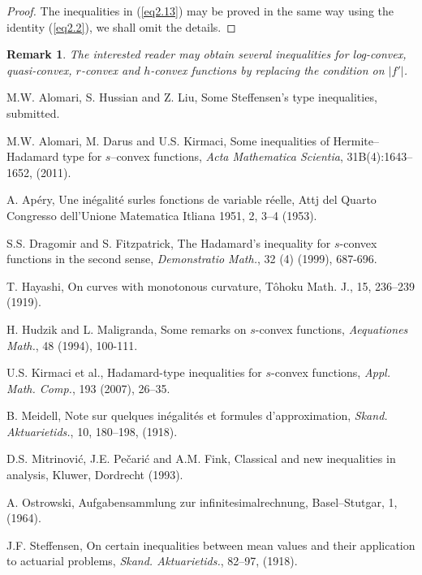 \documentclass{amsart}
\theoremstyle{plain}
\newtheorem{remark}{Remark}
\numberwithin{equation}{section}
\begin{document}
\begin{proof}
The inequalities in (\ref{eq2.13}) may be proved in the same way
using the identity (\ref{eq2.2}), we shall omit the details.
\end{proof}

\begin{remark}
The interested reader may obtain several inequalities for
log-convex, quasi-convex, $r$-convex and $h$-convex functions by
replacing the condition on $|f'|$.
\end{remark}














\begin{thebibliography}{9}
\setlength{\itemsep}{5pt}

M.W. Alomari, S. Hussian and Z. Liu, Some Steffensen's type
inequalities, submitted.

M.W. Alomari, M. Darus and U.S. Kirmaci, Some inequalities of
Hermite--Hadamard type for $s$--convex functions, \textit{Acta
Mathematica Scientia}, 31B(4):1643--1652, (2011).


A. Ap\'{e}ry, Une in\'{e}galit\'{e} surles fonctions de variable
r\'{e}elle, Attj del Quarto Congresso dell'Unione Matematica
Itliana 1951, 2, 3--4 (1953).

 S.S. Dragomir and S. Fitzpatrick, The Hadamard's inequality for
$s$-convex functions in the second sense, \emph{Demonstratio
Math.}, 32 (4) (1999), 687-696.

T. Hayashi, On curves with monotonous curvature, T\^{o}hoku Math.
J., 15, 236--239 (1919).


 H. Hudzik and L. Maligranda, Some remarks on $s$-convex
functions, \emph{Aequationes Math.}, 48 (1994), 100-111.

 {U.S. Kirmaci et al., Hadamard-type inequalities for $s$-convex
functions, \emph{Appl. Math. Comp.},} {193} (2007), 26--35.

B. Meidell, Note sur quelques in\'{e}galit\'{e}s et formules
d'approximation, \textit{Skand. Aktuarietids.}, 10, 180--198,
(1918).

D.S. Mitrinovi\'{c}, J.E. Pe\v{c}ari\'{c} and A.M. Fink, Classical
and new inequalities in analysis, Kluwer, Dordrecht (1993).


A. Ostrowski, Aufgabensammlung zur infinitesimalrechnung,
Basel--Stutgar, 1, (1964).


J.F. Steffensen, On certain inequalities between mean values and
their application to actuarial problems, \textit{Skand.
Aktuarietids.},  82--97, (1918).

\end{thebibliography}
\end{document}
